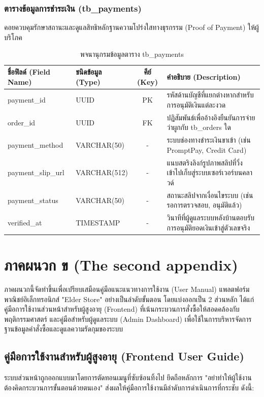 \subsection{ตารางข้อมูลการชำระเงิน (tb\_payments)}
คอยควบคุมรักษาสถานะและดูแลสิทธิหลักฐานความโปร่งใสทางธุรกรรม (Proof of Payment) ให้ผู้บริโภค
\begin{table}[h!]
\centering
\caption{พจนานุกรมข้อมูลตาราง tb\_payments}
\vspace{0.2cm}
\begin{tabular}{|l|l|c|l|}
\hline
\textbf{ชื่อฟิลด์ (Field Name)} & \textbf{ชนิดข้อมูล (Type)} & \textbf{คีย์ (Key)} & \textbf{คำอธิบาย (Description)} \\ \hline
payment\_id & UUID & PK & รหัสด้านบัญชีที่แยกต่างหากสำหรับการอนุมัติเงินแต่ละงวด \\ \hline
order\_id & UUID & FK & ปฏิสัมพันธ์เพื่ออ้างอิงยืนยันการจ่ายว่าผูกกับ tb\_orders ใด \\ \hline
payment\_method & VARCHAR(50) & - & ระบบช่องทางชำระเงินขาเข้า (เช่น PromptPay, Credit Card) \\ \hline
payment\_slip\_url & VARCHAR(512) & - & แนบสตริงลิงก์รูปภาพสลิปที่วิ่งเข้าไปเก็บสู่ระบบเซอร์เวอร์บนคลาวด์ \\ \hline
payment\_status & VARCHAR(50) & - & สถานะสลิปจากเงื่อนไขระบบ (เช่น รอการตรวจสอบ, อนุมัติแล้ว) \\ \hline
verified\_at & TIMESTAMP & - & วินาทีที่ผู้ดูแลระบบหลังบ้านตอบรับการอนุมัติยอดเงินเข้าสู่ตัวเลขจริง \\ \hline
\end{tabular}
\end{table}

\chapter{ภาคผนวก ข (The second appendix)}

ภาคผนวกนี้จัดทำขึ้นเพื่อเปรียบเสมือนคู่มือแนะแนวทางการใช้งาน (User Manual) แพลตฟอร์มพาณิชย์อิเล็กทรอนิกส์ "Elder Store" อย่างเป็นลำดับขั้นตอน โดยแบ่งออกเป็น 2 ส่วนหลัก ได้แก่ คู่มือการใช้งานส่วนหน้าสำหรับผู้สูงอายุ (Frontend) ที่เน้นกระบวนการสั่งซื้อให้สอดคล้องกับพฤติกรรมศาสตร์ และคู่มือสำหรับผู้ดูแลระบบ (Admin Dashboard) เพื่อใช้ในการบริหารจัดการฐานข้อมูลคำสั่งซื้อและดูแลความรัดกุมของระบบ

\section{คู่มือการใช้งานสำหรับผู้สูงอายุ (Frontend User Guide)}
ระบบส่วนหน้าถูกออกแบบมาโดยการตัดทอนเมนูที่ซับซ้อนทิ้งไป ยึดถือหลักการ "อย่าทำให้ผู้ใช้งานต้องคิดกระบวนการขั้นตอนด้วยตนเอง" ส่งผลให้คู่มือการใช้งานมีลำดับการดำเนินการที่กระชับ ดังนี้:

